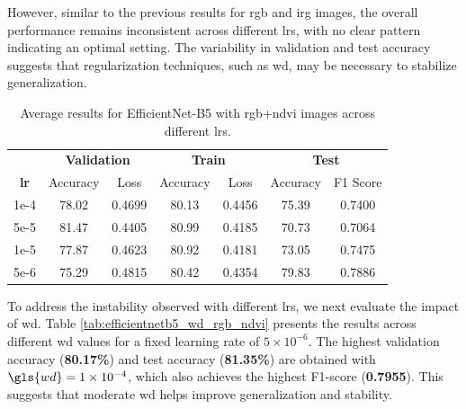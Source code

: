 However, similar to the previous results for \gls{rgb} and \gls{irg} images, the overall performance 
remains inconsistent across different \glspl{lr}, with no clear pattern indicating 
an optimal setting. The variability in validation and test accuracy suggests that 
regularization techniques, such as \gls{wd}, may be necessary to stabilize generalization.

\begin{table}[h]
    \centering
    \renewcommand{\arraystretch}{1.3}
    \setlength{\tabcolsep}{8pt}
    \begin{tabular}{|c|cccccc|}
        \hline
        & \multicolumn{2}{c}{\textbf{Validation}} & \multicolumn{2}{c}{\textbf{Train}} & \multicolumn{2}{c|}{\textbf{Test}} \\
        \textbf{\gls{lr}} & Accuracy & Loss & Accuracy & Loss & Accuracy & F1 Score \\
        \hline
        1e-4   & 78.02 &  0.4699 & 80.13 & 0.4456 & 75.39 & 0.7400 \\
        5e-5   & 81.47 &  0.4405 & 80.99 & 0.4185 & 70.73 & 0.7064 \\
        1e-5   & 77.87 &  0.4623 & 80.92 & 0.4181 & 73.05 & 0.7475 \\
        5e-6   & 75.29 &  0.4815 & 80.42 & 0.4354 & 79.83 & 0.7886 \\
        \hline
    \end{tabular}
    \caption{Average results for EfficientNet-B5 with \gls{rgb}+\gls{ndvi} images across different \glspl{lr}.}
    \label{tab:efficientnetb5_lr_rgb_ndvi}
\end{table}

To address the instability observed with different \glspl{lr}, we next evaluate the impact 
of \gls{wd}. Table \ref{tab:efficientnetb5_wd_rgb_ndvi} presents the results across different 
\gls{wd} values for a fixed learning rate of $5\times10^{-6}$. The highest validation 
accuracy (\textbf{80.17\%}) and test accuracy (\textbf{81.35\%}) are obtained with $\gls{wd}=1\times10^{-4}$, which also 
achieves the highest F1-score (\textbf{0.7955}). This suggests that moderate \gls{wd} helps improve 
generalization and stability.


